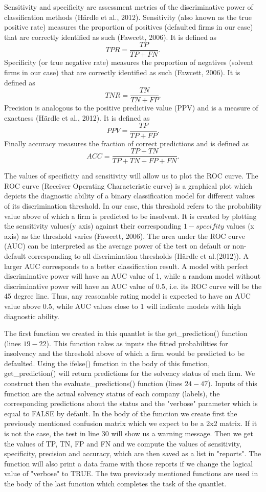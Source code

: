 \documentclass{article}
\begin{document}
Sensitivity and specificity are assessment metrics of the discriminative power of classification methods (H{\"a}rdle et al., 2012). Sensitivity (also known as the true positive rate) measures the proportion of positives (defaulted firms in our case) that are correctly identified as such (Fawcett, 2006). It is defined as $$TPR=\frac{TP}{TP+FN}.$$ Specificity (or true negative rate) measures the proportion of negatives (solvent firms in our case) that are correctly identified as such (Fawcett, 2006). It is defined as $$TNR=\frac{TN}{TN+FP}.$$ Precision is analogous to the positive predictive value (PPV) and is a measure of exactness (H{\"a}rdle et al., 2012). It is defined as $$PPV=\frac{TP}{TP+FP}.$$ Finally accuracy measures the fraction of correct predictions and is defined as $$ACC = \frac{TP+TN}{TP+TN+FP+FN}.$$

The values of specificity and sensitivity will allow us to plot the ROC curve. The ROC curve (Receiver Operating Characteristic curve) is a graphical plot which depicts the diagnostic ability of a binary classification model for different values of its discrimination threshold. In our case, this threshold refers to the probability value above of which a firm is predicted to be insolvent. It is created by plotting the sensitivity values(y axis) against their corresponding $1-specifity$ values (x axis) as the threshold varies (Fawcett, 2006). The area under the ROC curve (AUC) can be interpreted as the average power of the test on default or non-default corresponding to all discrimination thresholds (H\"ardle et al.(2012)). A larger AUC corresponds to a better classification result. A model with perfect discriminative power will have an AUC value of 1, while a random model without discriminative power will have an AUC value of 0.5, i.e. its ROC curve will be the 45 degree line. Thus, any reasonable rating model is expected to have an AUC value above 0.5, while AUC values close to 1 will indicate models with high diagnostic ability.  

The first function we created in this quantlet is the get\_prediction() function (lines $19-22$). This function takes as inputs the fitted probabilities for insolvency and the threshold above of which a firm would be predicted to be defaulted. Using the ifelse() function in the body of this function, get\_prediction() will return predictions for the solvency status of each firm. We construct then the evaluate\_predictions() function (lines $24-47$). Inputs of this function are the actual solvency status of each company (labels), the corresponding predictions about the status and the "verbose" parameter which is equal to FALSE by default. In the body of the function we create first the previously mentioned confusion matrix which we expect to be a 2x2 matrix. If it is not the case, the test in line 30 will show us a warning message. Then we get the values of TP, TN, FP and FN and we compute the values of sensitivity, specificity, precision and accuracy, which are then saved as a list in "reports". The function will also print a data frame with those reports if we change the logical value of "verbose" to TRUE. The two previously mentioned functions are used in the body of the last function which completes the task of the quantlet. 
\end{document}
